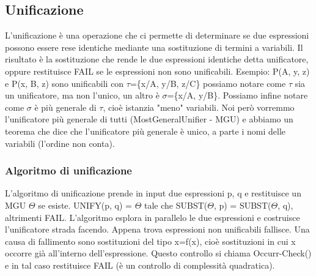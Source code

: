 \documentclass{article}
\begin{document}
\subsection{Unificazione}
L'unificazione è una operazione che ci permette di determinare se due espressioni possono essere rese identiche mediante una sostituzione di termini a variabili. Il risultato è la sostituzione che rende le due espressioni identiche detta unificatore, oppure restituisce FAIL se le espressioni non sono unificabili. \newline
Esempio: P(A, y, z) e P(x, B, z) sono unificabili con $\tau$=\{x/A, y/B, z/C\} \newline
possiamo notare come $\tau$ sia un unificatore, ma non l'unico, un altro è $\sigma$=\{x/A, y/B\}. \newline 
Possiamo infine notare come $\sigma$ è più generale di $\tau$, cioè istanzia "meno" variabili. Noi però vorremmo l’unificatore più generale di tutti (MostGeneralUnifier - MGU) e abbiamo un teorema che dice che l’unificatore più generale è unico, a parte i nomi delle variabili (l’ordine non conta).

\subsubsection{Algoritmo di unificazione}
L’algoritmo di unificazione prende in input due espressioni p, q e restituisce un MGU $\Theta$ se esiste. UNIFY(p, q) = $\Theta$ tale che SUBST($\Theta$, p) = SUBST($\Theta$, q), altrimenti FAIL. L’algoritmo esplora in parallelo le due espressioni e costruisce l’unificatore strada facendo. Appena trova espressioni non unificabili fallisce. Una causa di fallimento sono sostituzioni del tipo x=f(x), cioè sostituzioni in cui x occorre già all'interno dell'espressione. Questo controllo si chiama Occurr-Check() e in tal caso restituisce FAIL (è un controllo di complessità quadratica).
\end{document}
